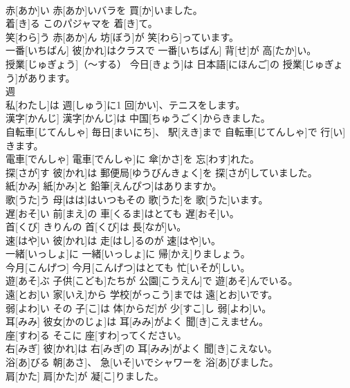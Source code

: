 \documentclass[8pt]{extreport}
\begin{document}
\begin{CJK}{UTF8}{min}
\\	赤[あか]い	赤[あか]いバラを 買[か]いました。		
\\	着[き]る	このパジャマを 着[き]て。		
\\	笑[わら]う	赤[あか]ん 坊[ぼう]が 笑[わら]っています。		
\\	一番[いちばん]	彼[かれ]はクラスで 一番[いちばん] 背[せ]が 高[たか]い。		
\\	授業[じゅぎょう]（～する）	今日[きょう]は 日本語[にほんご]の 授業[じゅぎょう]があります。		
\\	週
\\	[しゅう]	私[わたし]は 週[しゅう]に1 回[かい]、テニスをします。		
\\	漢字[かんじ]	漢字[かんじ]は 中国[ちゅうごく]からきました。		
\\	自転車[じてんしゃ]	毎日[まいにち]、 駅[えき]まで 自転車[じてんしゃ]で 行[い]きます。		
\\	電車[でんしゃ]	電車[でんしゃ]に 傘[かさ]を 忘[わす]れた。		
\\	探[さが]す	彼[かれ]は 郵便局[ゆうびんきょく]を 探[さが]していました。		
\\	紙[かみ]	紙[かみ]と 鉛筆[えんぴつ]はありますか。		
\\	歌[うた]う	母[はは]はいつもその 歌[うた]を 歌[うた]います。		
\\	遅[おそ]い	前[まえ]の 車[くるま]はとても 遅[おそ]い。		
\\	首[くび]	きりんの 首[くび]は 長[なが]い。		
\\	速[はや]い	彼[かれ]は 走[はし]るのが 速[はや]い。		
\\	一緒[いっしょ]に	一緒[いっしょ]に 帰[かえ]りましょう。		
\\	今月[こんげつ]	今月[こんげつ]はとても 忙[いそが]しい。		
\\	遊[あそ]ぶ	子供[こども]たちが 公園[こうえん]で 遊[あそ]んでいる。		
\\	遠[とお]い	家[いえ]から 学校[がっこう]までは 遠[とお]いです。		
\\	弱[よわ]い	その 子[こ]は 体[からだ]が 少[すこ]し 弱[よわ]い。		
\\	耳[みみ]	彼女[かのじょ]は 耳[みみ]がよく 聞[き]こえません。		
\\	座[すわ]る	そこに 座[すわ]ってください。		
\\	右[みぎ]	彼[かれ]は 右[みぎ]の 耳[みみ]がよく 聞[き]こえない。		
\\	浴[あ]びる	朝[あさ]、 急[いそ]いでシャワーを 浴[あ]びました。		
\\	肩[かた]	肩[かた]が 凝[こ]りました。		

\end{CJK}
\end{document}
